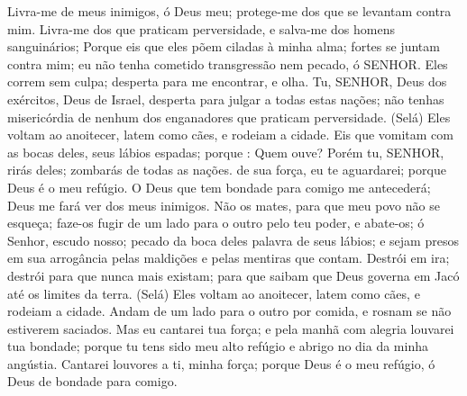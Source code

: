 {\PP 
  Livra-me de meus inimigos, ó Deus meu; protege-me dos que se levantam contra mim.
  Livra-me dos que praticam perversidade, e salva-me dos homens sanguinários;
  Porque eis que eles põem ciladas à minha alma; fortes se juntam contra mim;
{} eu não tenha cometido transgressão nem pecado, ó SENHOR.
  Eles correm sem
{} culpa; desperta para me encontrar, e olha.
  Tu, SENHOR, Deus dos exércitos, Deus de Israel, desperta para julgar a todas estas nações; não tenhas misericórdia de nenhum dos enganadores que praticam perversidade. (Selá)
  Eles voltam ao anoitecer, latem como cães, e rodeiam a cidade.
  Eis que vomitam com as bocas deles, seus lábios
{} espadas; porque
{} : Quem ouve?
  Porém tu, SENHOR, rirás deles; zombarás de todas as nações.
   de sua força, eu te aguardarei; porque Deus é o meu refúgio.
  O Deus que tem bondade para comigo me antecederá; Deus me fará ver
{} dos meus inimigos.
  Não os mates, para que meu povo não se esqueça; faze-os fugir de um lado para o outro pelo teu poder, e abate-os; ó Senhor, escudo nosso;
   pecado da boca deles
{} palavra de seus lábios; e sejam presos em sua arrogância pelas maldições e pelas mentiras que contam.
  Destrói
{} em
{} ira; destrói
{} para que nunca mais existam; para que saibam que Deus governa em Jacó até os limites da terra. (Selá)
  Eles voltam ao anoitecer, latem como cães, e rodeiam a cidade.
  Andam de um lado para o outro por comida, e rosnam se não estiverem saciados.
  Mas eu cantarei
{} tua força; e pela manhã com alegria louvarei tua bondade; porque tu tens sido meu alto refúgio e abrigo no dia da minha angústia.
  Cantarei louvores a ti,
{} minha força; porque Deus é o meu refúgio, ó Deus de bondade para comigo.
\par }



